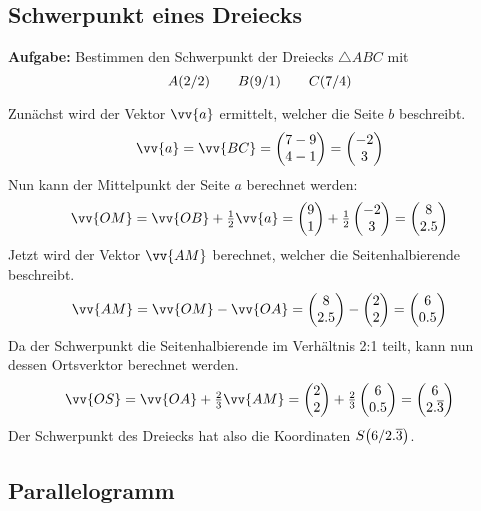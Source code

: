\subsection{Schwerpunkt eines Dreiecks}
\textbf{Aufgabe:} Bestimmen den Schwerpunkt der Dreiecks $\triangle ABC$ mit
\[
  \pxy[A]{2,2} \qquad \pxy[B]{9,1} \qquad \pxy[C]{7,4}
\]
\begin{center}
\end{center}
Zunächst wird der Vektor $\vv{a}$ ermittelt, welcher die Seite $b$ beschreibt.
\[
  \vv{a} = \vv{BC} = \vxy{7-9,4-1} = \vxy{-2,3}
\]
Nun kann der Mittelpunkt der Seite $a$ berechnet werden:
\[
  \vv{OM} = \vv{OB}+\tfrac{1}{2}\vv{a} = \vxy{9,1}+\tfrac{1}{2}\vxy{-2,3} = \vxy{8,2.5}
\]
Jetzt wird der Vektor $\vv{AM}$ berechnet, welcher die Seitenhalbierende beschreibt.
\[
  \vv{AM} = \vv{OM}-\vv{OA} = \vxy{8,2.5}-\vxy{2,2} = \vxy{6,0.5}
\]
Da der Schwerpunkt die Seitenhalbierende im Verhältnis 2:1 teilt, kann nun dessen Ortsverktor berechnet werden.
\[
  \vv{OS} = \vv{OA}+\tfrac{2}{3}\vv{AM} = \vxy{2,2}+\tfrac{2}{3}\vxy{6,0.5} = \vxy{6,2.\overline{3}}
\]
Der Schwerpunkt des Dreiecks hat also die Koordinaten $\pxy[S]{6,2.\overline{3}}$.
\newpage
\subsection{Parallelogramm}

